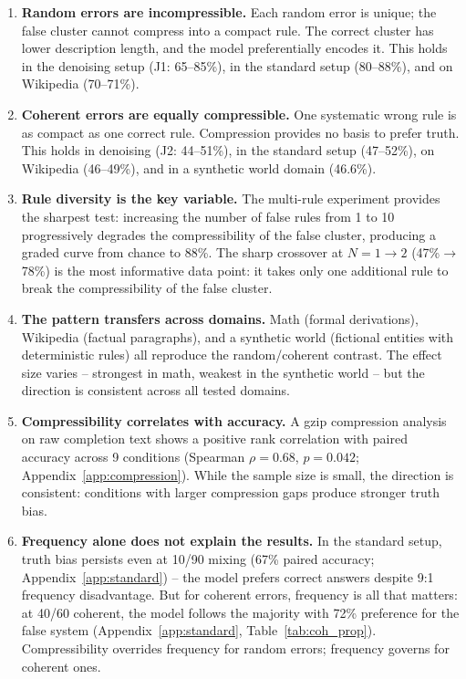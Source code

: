 \documentclass[10pt]{article} %
\begin{document}
\begin{enumerate}
    \item \textbf{Random errors are incompressible.} Each random error is unique; the false cluster cannot compress into a compact rule. The correct cluster has lower description length, and the model preferentially encodes it. This holds in the denoising setup (J1: 65--85\%), in the standard setup (80--88\%), and on Wikipedia (70--71\%).

    \item \textbf{Coherent errors are equally compressible.} One systematic wrong rule is as compact as one correct rule. Compression provides no basis to prefer truth. This holds in denoising (J2: 44--51\%), in the standard setup (47--52\%), on Wikipedia (46--49\%), and in a synthetic world domain (46.6\%).

    \item \textbf{Rule diversity is the key variable.} The multi-rule experiment provides the sharpest test: increasing the number of false rules from 1 to 10 progressively degrades the compressibility of the false cluster, producing a graded curve from chance to 88\%. The sharp crossover at $N{=}1 \to 2$ (47\%$\to$78\%) is the most informative data point: it takes only one additional rule to break the compressibility of the false cluster.

    \item \textbf{The pattern transfers across domains.} Math (formal derivations), Wikipedia (factual paragraphs), and a synthetic world (fictional entities with deterministic rules) all reproduce the random/coherent contrast. The effect size varies -- strongest in math, weakest in the synthetic world -- but the direction is consistent across all tested domains.

    \item \textbf{Compressibility correlates with accuracy.} A gzip compression analysis on raw completion text shows a positive rank correlation with paired accuracy across 9 conditions (Spearman $\rho = 0.68$, $p = 0.042$; Appendix~\ref{app:compression}). While the sample size is small, the direction is consistent: conditions with larger compression gaps produce stronger truth bias.

    \item \textbf{Frequency alone does not explain the results.} In the standard setup, truth bias persists even at 10/90 mixing (67\% paired accuracy; Appendix~\ref{app:standard}) -- the model prefers correct answers despite 9:1 frequency disadvantage. But for coherent errors, frequency is all that matters: at 40/60 coherent, the model follows the majority with 72\% preference for the false system (Appendix~\ref{app:standard}, Table~\ref{tab:coh_prop}). Compressibility overrides frequency for random errors; frequency governs for coherent ones.
\end{enumerate}
\end{document}
